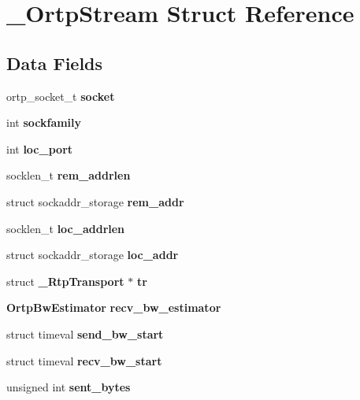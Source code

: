 \section{\+\_\+\+Ortp\+Stream Struct Reference}
\label{struct__OrtpStream}
\subsection*{Data Fields}
\begin{DoxyCompactItemize}
\item 
\mbox{\label{struct__OrtpStream_a8cfe5a9fb65835b502c1ed1bc1450203}} 
ortp\+\_\+socket\+\_\+t {\bfseries socket}
\item 
\mbox{\label{struct__OrtpStream_a2de003d351a7460c5cc7bf9005f8f083}} 
int {\bfseries sockfamily}
\item 
\mbox{\label{struct__OrtpStream_a9c9a525402e6ea16c3d660d275563549}} 
int {\bfseries loc\+\_\+port}
\item 
\mbox{\label{struct__OrtpStream_a98b2ac8c10a414262ea37a3e3e3eeba9}} 
socklen\+\_\+t {\bfseries rem\+\_\+addrlen}
\item 
\mbox{\label{struct__OrtpStream_a3992ca005350d71488e2c54a657de81a}} 
struct sockaddr\+\_\+storage {\bfseries rem\+\_\+addr}
\item 
\mbox{\label{struct__OrtpStream_afa5c07cc637d2fc1a0a988df44887b22}} 
socklen\+\_\+t {\bfseries loc\+\_\+addrlen}
\item 
\mbox{\label{struct__OrtpStream_a54a8b2042ec7bfec91c2727c0397875f}} 
struct sockaddr\+\_\+storage {\bfseries loc\+\_\+addr}
\item 
\mbox{\label{struct__OrtpStream_a2312c55bcb04bdb0b1a35f37e3159b20}} 
struct \textbf{ \+\_\+\+Rtp\+Transport} $\ast$ {\bfseries tr}
\item 
\mbox{\label{struct__OrtpStream_a85728145379221a3dab3521959651116}} 
\textbf{ Ortp\+Bw\+Estimator} {\bfseries recv\+\_\+bw\+\_\+estimator}
\item 
\mbox{\label{struct__OrtpStream_acdff300d31a5e55eebfe740f3dac39c3}} 
struct timeval {\bfseries send\+\_\+bw\+\_\+start}
\item 
\mbox{\label{struct__OrtpStream_ae40bcf93768b3bdff899fcfe65435da3}} 
struct timeval {\bfseries recv\+\_\+bw\+\_\+start}
\item 
\mbox{\label{struct__OrtpStream_ac2462b2214f6cc13f95923e6dab6cb4b}} 
unsigned int {\bfseries sent\+\_\+bytes}
\item 
\mbox{\label{struct__OrtpStream_a232d68fc74e927898bf00c383c7d02b8}} 

\end{DoxyCompactItemize}

